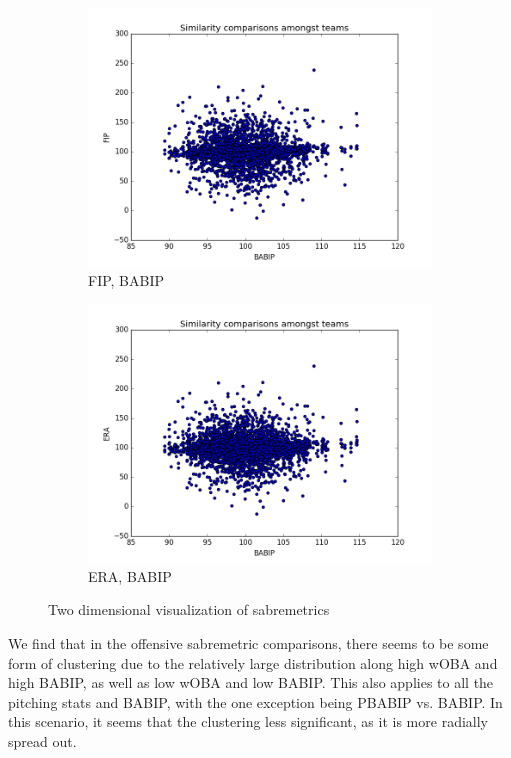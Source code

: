 \documentclass[12pt]{article}
\numberwithin{equation}{subsection}
\begin{document}
\begin{figure}[H]
  \begin{subfigure}[b]{0.5\linewidth}
    \centering
    \includegraphics[width=0.9\linewidth]{Sim9} 
    \caption{FIP, BABIP} 
    \label{fig5:c} 
  \end{subfigure}%
  \begin{subfigure}[b]{0.5\linewidth}
    \centering
    \includegraphics[width=0.9\linewidth]{Sim10} 
    \caption{ERA, BABIP} 
    \label{fig5:d} 
  \end{subfigure} 
  \caption{Two dimensional visualization of sabremetrics}
  \label{fig5} 
 \end{figure}
  
  We find that in the offensive sabremetric comparisons, there seems to be some form of clustering due to the relatively large distribution along high wOBA and high BABIP, as well as low wOBA and low BABIP. This also applies to all the pitching stats and BABIP, with the one exception being PBABIP vs. BABIP. In this scenario, it seems that the clustering less significant, as it is more radially spread out. 
  
\end{document}

